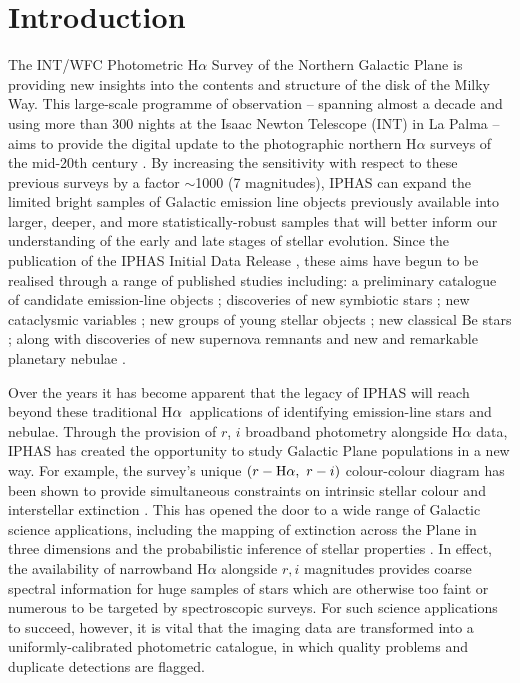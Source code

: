 \documentclass[useAMS,usenatbib]{mn2e}
\def\ha{\mbox{H$\rm \alpha$}}
\begin{document}
\section{Introduction}
The INT/WFC Photometric H$\alpha$ Survey
of the Northern Galactic Plane \citep[IPHAS;][]{Drew2005}
is providing new insights into the contents and structure of the disk of the Milky Way.
This large-scale programme of observation
-- spanning almost a decade 
and using more than 300 nights 
at the Isaac Newton Telescope (INT) in La Palma --
aims to provide the digital update 
to the photographic northern H$\alpha$ surveys 
of the mid-20th century \citep[see][]{Kohoutek1999}. 
By increasing the sensitivity 
with respect to these previous surveys 
by a factor $\sim$1000 (7 magnitudes), 
IPHAS can expand
the limited bright samples of Galactic emission line objects 
previously available into larger, deeper, and more statistically-robust samples that will 
better inform our understanding 
of the early and late stages of stellar evolution.
Since the publication of the IPHAS Initial Data Release \citep[IDR;][]{Gonzalez-Solares2008},
these aims have begun to be realised through a
range of published studies including: 
a preliminary catalogue of candidate emission-line objects \citep{Witham2008};
discoveries of new symbiotic stars \citep{Corradi2008, Corradi2010, Corradi2011}; 
new cataclysmic variables \citep{Witham2007}; 
new groups of young stellar objects
\citep{Vink2008,Barentsen2011a,Wright2012};
new classical Be stars \citep{Raddi2013};
along with discoveries of new supernova remnants \citep{Sabin2013}
and new and remarkable planetary nebulae 
\citep{Mampaso2006, Viironen2009a, Viironen2009b, Sabin2010, Corradi2011, Viironen2011}.

Over the years it has become apparent that the legacy of IPHAS 
will reach beyond these traditional \ha\ applications 
of identifying emission-line stars and nebulae. 
Through the provision of $r$, $i$ broadband photometry 
alongside H$\alpha$ data,
IPHAS has created the opportunity 
to study Galactic Plane populations 
in a new way.
For example, the survey’s unique $(r-\ha,\ r-i)$ colour-colour
diagram has been shown to provide simultaneous constraints 
on intrinsic stellar colour and interstellar extinction \citep{Drew2008}. 
This has opened the door 
to a wide range of Galactic science applications, 
including the mapping of extinction across the Plane in three dimensions
and the probabilistic inference of stellar properties
\citep{Sale2009, Sale2010, Giammanco2011, Sale2012, Barentsen2013}. 
In effect, the availability of narrowband H$\alpha$ 
alongside $r, i$ magnitudes
provides coarse spectral information for huge samples of stars 
which are otherwise too faint or numerous 
to be targeted by spectroscopic surveys.
For such science applications to succeed, however, 
it is vital that the imaging data are transformed 
into a uniformly-calibrated photometric catalogue, 
in which quality problems 
and duplicate detections are flagged. 
\end{document}
